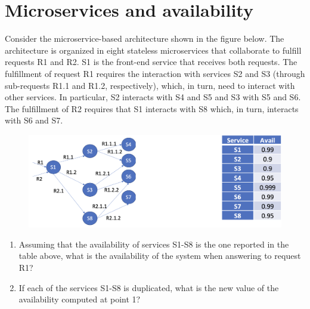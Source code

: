 \section{Microservices and availability}

Consider the microservice-based architecture shown in the figure below. 
The architecture is organized in eight stateless microservices that collaborate to fulfill requests R1 and R2. 
S1 is the front-end service that receives both requests. 
The fulfillment of request R1 requires the interaction with services S2 and S3 (through sub-requests R1.1 and R1.2, respectively), which, in turn, need to interact with other services. 
In particular, S2 interacts with S4 and S5 and S3 with S5 and S6.
The fulfillment of R2 requires that S1 interacts with S8 which, in turn, interacts with S6 and S7.
\begin{figure}[H]
    \centering
    \includegraphics[width=0.9\linewidth]{images/micro.png}
\end{figure}
\begin{enumerate}
    \item Assuming that the availability of services S1-S8 is the one reported in the table above, what is the availability of the system when answering to request R1?
    \item If each of the services S1-S8 is duplicated, what is the new value of the availability computed at point 1?
\end{enumerate}

